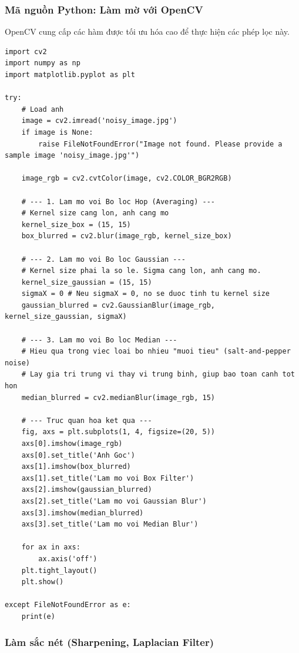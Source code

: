 \subsubsection{Mã nguồn Python: Làm mờ với OpenCV}
\label{subsubsec:blurring_python}
OpenCV cung cấp các hàm được tối ưu hóa cao để thực hiện các phép lọc này.
\begin{verbatim}
import cv2
import numpy as np
import matplotlib.pyplot as plt

try:
    # Load anh
    image = cv2.imread('noisy_image.jpg')
    if image is None:
        raise FileNotFoundError("Image not found. Please provide a sample image 'noisy_image.jpg'")
    
    image_rgb = cv2.cvtColor(image, cv2.COLOR_BGR2RGB)

    # --- 1. Lam mo voi Bo loc Hop (Averaging) ---
    # Kernel size cang lon, anh cang mo
    kernel_size_box = (15, 15)
    box_blurred = cv2.blur(image_rgb, kernel_size_box)

    # --- 2. Lam mo voi Bo loc Gaussian ---
    # Kernel size phai la so le. Sigma cang lon, anh cang mo.
    kernel_size_gaussian = (15, 15)
    sigmaX = 0 # Neu sigmaX = 0, no se duoc tinh tu kernel size
    gaussian_blurred = cv2.GaussianBlur(image_rgb, kernel_size_gaussian, sigmaX)

    # --- 3. Lam mo voi Bo loc Median ---
    # Hieu qua trong viec loai bo nhieu "muoi tieu" (salt-and-pepper noise)
    # Lay gia tri trung vi thay vi trung binh, giup bao toan canh tot hon
    median_blurred = cv2.medianBlur(image_rgb, 15)

    # --- Truc quan hoa ket qua ---
    fig, axs = plt.subplots(1, 4, figsize=(20, 5))
    axs[0].imshow(image_rgb)
    axs[0].set_title('Anh Goc')
    axs[1].imshow(box_blurred)
    axs[1].set_title('Lam mo voi Box Filter')
    axs[2].imshow(gaussian_blurred)
    axs[2].set_title('Lam mo voi Gaussian Blur')
    axs[3].imshow(median_blurred)
    axs[3].set_title('Lam mo voi Median Blur')

    for ax in axs:
        ax.axis('off')
    plt.tight_layout()
    plt.show()

except FileNotFoundError as e:
    print(e)
\end{verbatim}

\subsubsection{Làm sắc nét (Sharpening, Laplacian Filter)}
\label{subsec:sharpening_laplacian}

